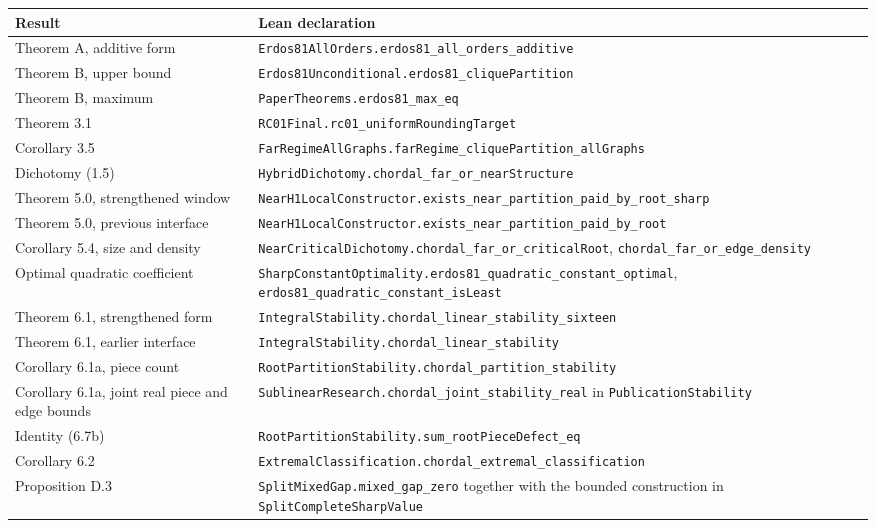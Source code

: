 \documentclass[english,11pt,a4paper]{article}
\newcounter{none}
\begin{document}
{\def\LTcaptype{none} %
\begin{longtable}[]{@{}
  >{\raggedright\arraybackslash}p{}
  >{\raggedright\arraybackslash}p{}@{}}
\toprule\noalign{}
\begin{minipage}[b]{\linewidth}\raggedright
Result
\end{minipage} & \begin{minipage}[b]{\linewidth}\raggedright
Lean declaration
\end{minipage} \\
\midrule\noalign{}
\endhead
\bottomrule\noalign{}
\endlastfoot
Theorem A, additive form &
\nolinkurl{Erdos81AllOrders.erdos81_all_orders_additive} \\
Theorem B, upper bound &
\nolinkurl{Erdos81Unconditional.erdos81_cliquePartition} \\
Theorem B, maximum & \nolinkurl{PaperTheorems.erdos81_max_eq} \\
Theorem 3.1 & \nolinkurl{RC01Final.rc01_uniformRoundingTarget} \\
Corollary 3.5 &
\nolinkurl{FarRegimeAllGraphs.farRegime_cliquePartition_allGraphs} \\
Dichotomy (1.5) &
\nolinkurl{HybridDichotomy.chordal_far_or_nearStructure} \\
Theorem 5.0, strengthened window &
\nolinkurl{NearH1LocalConstructor.exists_near_partition_paid_by_root_sharp} \\
Theorem 5.0, previous interface &
\nolinkurl{NearH1LocalConstructor.exists_near_partition_paid_by_root} \\
Corollary 5.4, size and density &
\nolinkurl{NearCriticalDichotomy.chordal_far_or_criticalRoot},
\nolinkurl{chordal_far_or_edge_density} \\
Optimal quadratic coefficient &
\nolinkurl{SharpConstantOptimality.erdos81_quadratic_constant_optimal},
\nolinkurl{erdos81_quadratic_constant_isLeast} \\
Theorem 6.1, strengthened form &
\nolinkurl{IntegralStability.chordal_linear_stability_sixteen} \\
Theorem 6.1, earlier interface &
\nolinkurl{IntegralStability.chordal_linear_stability} \\
Corollary 6.1a, piece count &
\nolinkurl{RootPartitionStability.chordal_partition_stability} \\
Corollary 6.1a, joint real piece and edge bounds &
\nolinkurl{SublinearResearch.chordal_joint_stability_real} in
\nolinkurl{PublicationStability} \\
Identity (6.7b) &
\nolinkurl{RootPartitionStability.sum_rootPieceDefect_eq} \\
Corollary 6.2 &
\nolinkurl{ExtremalClassification.chordal_extremal_classification} \\
Proposition D.3 & \nolinkurl{SplitMixedGap.mixed_gap_zero} together with
the bounded construction in \nolinkurl{SplitCompleteSharpValue} \\
\end{longtable}
}
\end{document}
